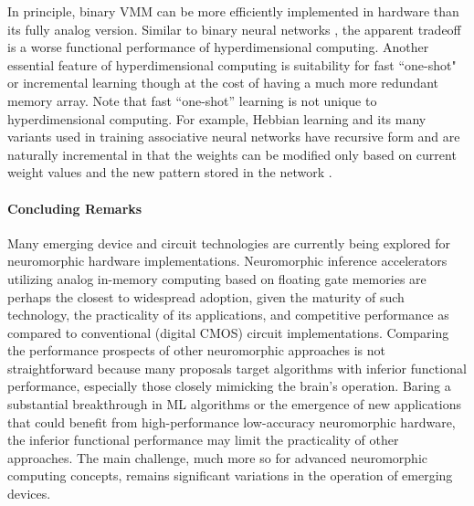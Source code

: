 In principle, binary VMM can be more efficiently implemented in hardware than its fully analog version. Similar to binary neural networks \cite{Simons2019}, the apparent tradeoff is a worse functional performance of hyperdimensional computing. Another essential feature of hyperdimensional computing is suitability for fast ``one-shot" or incremental learning \cite{Kanerva2009} though at the cost of having a much more redundant memory array. Note that fast ``one-shot” learning is not unique to hyperdimensional computing. For example, Hebbian learning and its many variants used in training associative neural networks have recursive form and are naturally incremental in that the weights can be modified only based on current weight values and the new pattern stored in the network \cite{Hertz1991}.  

\paragraph*{Concluding Remarks} Many emerging device and circuit technologies are currently being explored for neuromorphic hardware implementations. Neuromorphic inference accelerators utilizing analog in-memory computing based on floating gate memories are perhaps the closest to widespread adoption, given the maturity of such technology, the practicality of its applications, and competitive performance as compared to conventional (digital CMOS) circuit implementations. Comparing the performance prospects of other neuromorphic approaches is not straightforward because many proposals target algorithms with inferior functional performance, especially those closely mimicking the brain's operation. Baring a substantial breakthrough in ML algorithms or the emergence of new applications that could benefit from high-performance low-accuracy neuromorphic hardware, the inferior functional performance may limit the practicality of other approaches. The main challenge, much more so for advanced neuromorphic computing concepts, remains significant variations in the operation of emerging devices.

\clearpage







%
%
